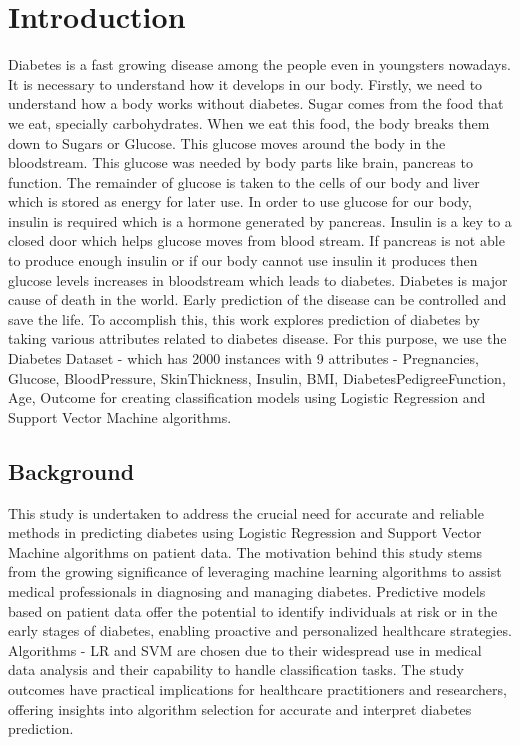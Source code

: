 \chapter{Introduction}
\label{ch:into} %

Diabetes is a fast growing disease among the people even in youngsters nowadays. It is necessary to understand how it develops in our body. Firstly, we need to understand how a body works without diabetes. Sugar comes from the food that we eat, specially carbohydrates. When we eat this food, the body breaks them down to Sugars or Glucose. This glucose moves around the body in the bloodstream. This glucose was needed by body parts like brain, pancreas to function. The remainder of glucose is taken to the cells of our body and liver which is stored as energy for later use. In order to use glucose for our body, insulin is required which is a hormone generated by pancreas. Insulin is a key to a closed door which helps glucose moves from blood stream. If pancreas is not able to produce enough insulin or if our body cannot use insulin it produces then glucose levels increases in bloodstream which leads to diabetes. Diabetes is major cause of death in the world. Early prediction of the disease can be controlled and save the life. To accomplish this, this work explores prediction of diabetes by taking various attributes related to diabetes disease. For this purpose, we use the Diabetes Dataset -\cite{dataset} which has 2000 instances with 9 attributes - Pregnancies, Glucose, BloodPressure, SkinThickness, Insulin, BMI, DiabetesPedigreeFunction, Age, Outcome for creating classification models using Logistic Regression and Support Vector Machine algorithms.

\section{Background}
\label{sec:into_back}
This study is undertaken to address the crucial need for accurate and reliable methods in predicting diabetes using Logistic Regression and Support Vector Machine algorithms on patient data. The motivation behind this study stems from the growing significance of leveraging machine learning algorithms to assist medical professionals in diagnosing and managing diabetes. Predictive models based on patient data offer the potential to identify individuals at risk or in the early stages of diabetes, enabling proactive and personalized healthcare strategies. Algorithms - LR and SVM are chosen due to their widespread use in medical data analysis and their capability to handle classification tasks. The study outcomes have practical implications for healthcare practitioners and researchers, offering insights into algorithm selection for accurate and interpret diabetes prediction.

